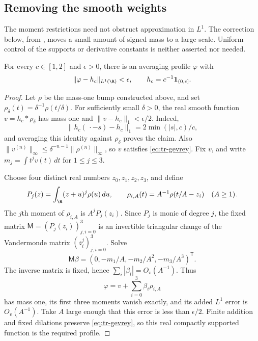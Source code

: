 \subsection{Removing the smooth weights}

The moment restrictions need not obstruct approximation in \(L^1\).
The correction below, from \cite[Lemma~2.8]{V}, moves a small amount
of signed mass to a large scale.  Uniform control of the supports or
derivative constants is neither asserted nor needed.

\begin{lemma}
\label{lem:tr-density}
For every \(c\in[1,2]\) and \(\epsilon>0\), there is an averaging
profile \(\varphi\) with
\[
 \|\varphi-h_c\|_{L^1(\R)}<\epsilon,
 \qquad h_c=c^{-1}\mathbf1_{(0,c]}.
\]
\end{lemma}

\begin{proof}
Let \(\rho\) be the mass-one bump constructed above, and set
\(\rho_\delta(t)=\delta^{-1}\rho(t/\delta)\).  For sufficiently
small \(\delta>0\), the real smooth function
\(v=h_c*\rho_\delta\) has mass one and
\(\|v-h_c\|_1<\epsilon/2\).  Indeed,
\[
 \|h_c(\,\cdot-s)-h_c\|_1=2\min(|s|,c)/c,
\]
and averaging this identity against \(\rho_\delta\) proves the
claim.  Also
\(\|v^{(n)}\|_\infty\leq\delta^{-n-1}\|\rho^{(n)}\|_\infty\),
so \(v\) satisfies \eqref{eq:tr-gevrey}.  Fix \(v\), and write
\(m_j=\int t^jv(t)\,dt\) for \(1\leq j\leq3\).

Choose four distinct real numbers \(z_0,z_1,z_2,z_3\), and define
\[
 P_j(z)=\int_\R(z+u)^j\rho(u)\,du,
 \qquad \rho_{i,A}(t)=A^{-1}\rho(t/A-z_i)
 \quad(A\geq1).
\]
The \(j\)th moment of \(\rho_{i,A}\) is \(A^jP_j(z_i)\).
Since \(P_j\) is monic of degree \(j\), the fixed matrix
\(\mathsf M=(P_j(z_i))_{j,i=0}^3\) is an invertible triangular
change of the Vandermonde matrix \((z_i^j)_{j,i=0}^3\).  Solve
\[
 \mathsf M\beta=(0,-m_1/A,-m_2/A^2,-m_3/A^3)^{\mathsf T}.
\]
The inverse matrix is fixed, hence \(\sum_i|\beta_i|=O_v(A^{-1})\).
Thus
\[
 \varphi=v+\sum_{i=0}^3\beta_i\rho_{i,A}
\]
has mass one, its first three moments vanish exactly, and its added
\(L^1\) error is \(O_v(A^{-1})\).  Take \(A\) large enough that
this error is less than \(\epsilon/2\).  Finite addition and fixed
dilations preserve \eqref{eq:tr-gevrey}, so this real compactly
supported function is the required profile.
\end{proof}

